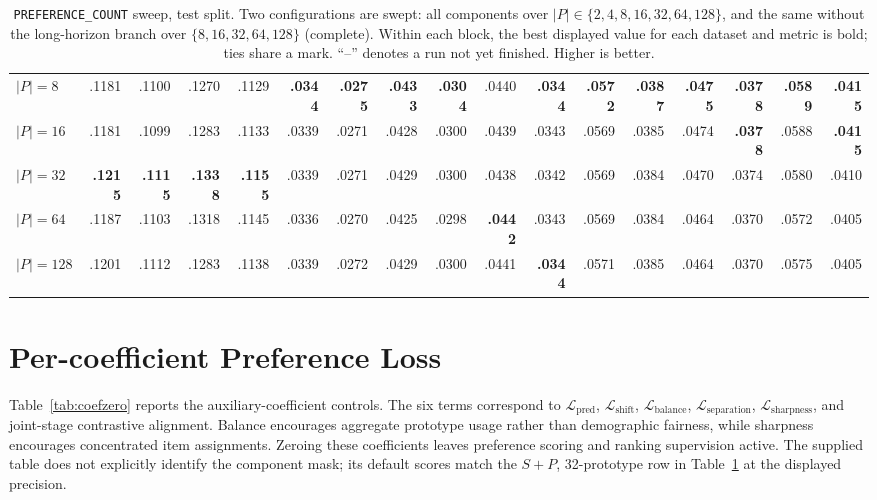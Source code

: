 \documentclass[11pt]{article}
\begin{document}
\begin{table}[!t]
{\begin{tabular}{l*{4}{rrrr}}
$|P|=8$ & .1181 & .1100 & .1270 & .1129 & \textbf{.0344} & \textbf{.0275} & \textbf{.0433} & \textbf{.0304} & .0440 & \textbf{.0344} & \textbf{.0572} & \textbf{.0387} & \textbf{.0475} & \textbf{.0378} & \textbf{.0589} & \textbf{.0415} \\
$|P|=16$ & .1181 & .1099 & .1283 & .1133 & .0339 & .0271 & .0428 & .0300 & .0439 & .0343 & .0569 & .0385 & .0474 & \textbf{.0378} & .0588 & \textbf{.0415} \\
$|P|=32$ & \textbf{.1215} & \textbf{.1115} & \textbf{.1338} & \textbf{.1155} & .0339 & .0271 & .0429 & .0300 & .0438 & .0342 & .0569 & .0384 & .0470 & .0374 & .0580 & .0410 \\
$|P|=64$ & .1187 & .1103 & .1318 & .1145 & .0336 & .0270 & .0425 & .0298 & \textbf{.0442} & .0343 & .0569 & .0384 & .0464 & .0370 & .0572 & .0405 \\
$|P|=128$ & .1201 & .1112 & .1283 & .1138 & .0339 & .0272 & .0429 & .0300 & .0441 & \textbf{.0344} & .0571 & .0385 & .0464 & .0370 & .0575 & .0405 \\
        \bottomrule
    \end{tabular}%
    }
    \caption{\texttt{PREFERENCE\_COUNT} sweep, test split. Two configurations are
    swept: all components over $|P| \in \{2,4,8,16,32,64,128\}$, and the same without
    the long-horizon branch over $\{8,16,32,64,128\}$ (complete). Within each block, the best displayed value for each dataset and metric is bold; ties share a mark. ``--'' denotes a run not yet finished.
    Higher is better.}
    \label{tab:prefsweep}
\end{table}




\section{Per-coefficient Preference Loss}

Table~\ref{tab:coefzero} reports the auxiliary-coefficient controls. The six terms correspond to $\mathcal L_{\mathrm{pred}}$, $\mathcal L_{\mathrm{shift}}$, $\mathcal L_{\mathrm{balance}}$, $\mathcal L_{\mathrm{separation}}$, $\mathcal L_{\mathrm{sharpness}}$, and joint-stage contrastive alignment. Balance encourages aggregate prototype usage rather than demographic fairness, while sharpness encourages concentrated item assignments. Zeroing these coefficients leaves preference scoring and ranking supervision active. The supplied table does not explicitly identify the component mask; its default scores match the $S+P$, 32-prototype row in Table~\ref{tab:prefsweep} at the displayed precision.
\end{document}
